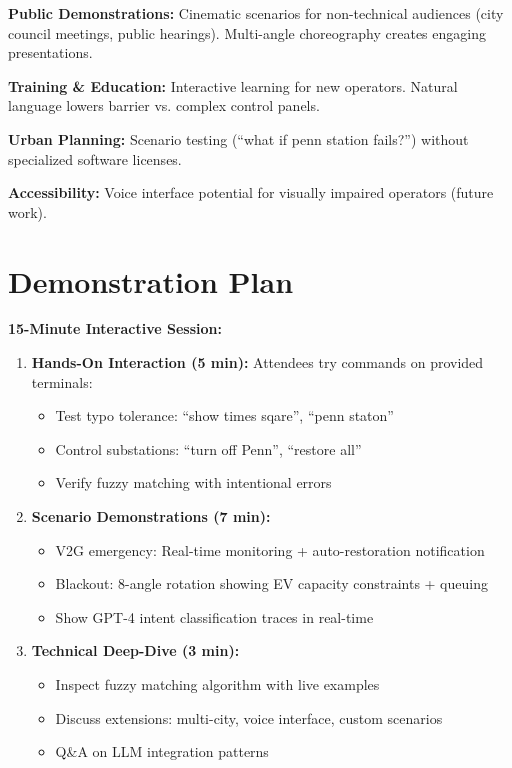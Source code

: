 \documentclass[sigconf]{acmart}
\begin{document}
\textbf{Public Demonstrations:} Cinematic scenarios for non-technical audiences (city council meetings, public hearings). Multi-angle choreography creates engaging presentations.

\textbf{Training \& Education:} Interactive learning for new operators. Natural language lowers barrier vs. complex control panels.

\textbf{Urban Planning:} Scenario testing (``what if penn station fails?'') without specialized software licenses.

\textbf{Accessibility:} Voice interface potential for visually impaired operators (future work).

\section{Demonstration Plan}

\textbf{15-Minute Interactive Session:}

\begin{enumerate}
    \item \textbf{Hands-On Interaction (5 min):} Attendees try commands on provided terminals:
        \begin{itemize}
            \item Test typo tolerance: ``show times sqare'', ``penn staton''
            \item Control substations: ``turn off Penn'', ``restore all''
            \item Verify fuzzy matching with intentional errors
        \end{itemize}
    \item \textbf{Scenario Demonstrations (7 min):}
        \begin{itemize}
            \item V2G emergency: Real-time monitoring + auto-restoration notification
            \item Blackout: 8-angle rotation showing EV capacity constraints + queuing
            \item Show GPT-4 intent classification traces in real-time
        \end{itemize}
    \item \textbf{Technical Deep-Dive (3 min):}
        \begin{itemize}
            \item Inspect fuzzy matching algorithm with live examples
            \item Discuss extensions: multi-city, voice interface, custom scenarios
            \item Q\&A on LLM integration patterns
        \end{itemize}
\end{enumerate}
\end{document}

